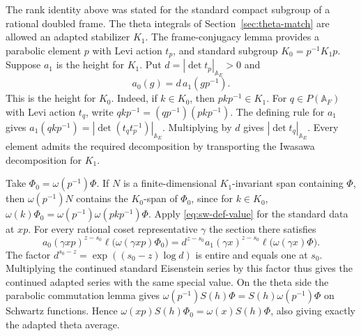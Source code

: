 The rank identity above was stated for the standard compact subgroup
of a rational doubled frame. The theta integrals of
Section~\ref{sec:theta-match} are allowed an adapted stabilizer
\(K_1\). The frame-conjugacy lemma provides a parabolic element
\(p\) with Levi action \(t_p\), and standard subgroup
\(K_0=p^{-1}K_1p\). Suppose \(a_1\) is the height for \(K_1\).
Put \(d=|\det t_p|_{\mathbb A_E}>0\) and
\[
                 a_0(g)=d\,a_1(gp^{-1}).
\]
This is the height for \(K_0\). Indeed, if \(k\in K_0\), then
\(pkp^{-1}\in K_1\). For \(q\in P(\mathbb A_F)\) with Levi
action \(t_q\), write \(qkp^{-1}=(qp^{-1})(pkp^{-1})\).
The defining rule for \(a_1\) gives
\(a_1(qkp^{-1})=|\det(t_qt_p^{-1})|_{\mathbb A_E}\).
Multiplying by \(d\) gives \(|\det t_q|_{\mathbb A_E}\).
Every element admits the required decomposition by transporting
the Iwasawa decomposition for \(K_1\).

Take \(\Phi_0=\omega(p^{-1})\Phi\). If \(N\) is a
finite-dimensional \(K_1\)-invariant span containing \(\Phi\),
then \(\omega(p^{-1})N\) contains the \(K_0\)-span of
\(\Phi_0\), since for \(k\in K_0\),
\(\omega(k)\Phi_0=\omega(p^{-1})\omega(pkp^{-1})\Phi\).
Apply \eqref{eq:sw-def-value} for the standard data at \(xp\).
For every rational coset representative \(\gamma\) the section
there satisfies
\[
 a_0(\gamma xp)^{z-s_0}
  \ell\bigl(\omega(\gamma xp)\Phi_0\bigr)
 =d^{z-s_0}a_1(\gamma x)^{z-s_0}
                   \ell\bigl(\omega(\gamma x)\Phi\bigr).
\]
The factor \(d^{s_0-z}=\exp((s_0-z)\log d)\) is entire and
equals one at \(s_0\). Multiplying the continued standard
Eisenstein series by this factor thus gives the continued
adapted series with the same special value.
On the theta side the parabolic commutation lemma gives
\(\omega(p^{-1})S(h)\Phi=S(h)\omega(p^{-1})\Phi\) on Schwartz
functions. Hence
\(\omega(xp)S(h)\Phi_0=\omega(x)S(h)\Phi\), also giving exactly
the adapted theta average.


